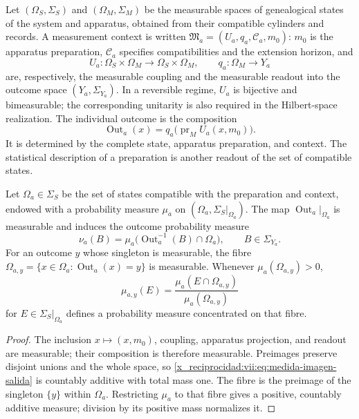 Let \((\Omega_S,\Sigma_S)\) and \((\Omega_M,\Sigma_M)\) be the
measurable spaces of genealogical states of the system and apparatus,
obtained from their compatible cylinders and records. A measurement
context is written \(\mathfrak M_a=(U_a,q_a,\mathcal C_a,m_0)\):
\(m_0\) is the apparatus preparation, \(\mathcal C_a\) specifies
compatibilities and the extension horizon, and
\[
 U_a:\Omega_S\times\Omega_M\longrightarrow\Omega_S\times\Omega_M,
 \qquad q_a:\Omega_M\longrightarrow Y_a
\]
are, respectively, the measurable coupling and the measurable readout into
the outcome space \((Y_a,\Sigma_{Y_a})\). In a reversible regime,
\(U_a\) is bijective and bimeasurable; the corresponding unitarity is
also required in the Hilbert-space realization. The individual outcome is the
composition
\begin{equation}
 \operatorname{Out}_a(x)
 =q_a\bigl(\operatorname{pr}_M U_a(x,m_0)\bigr).
 \label{x_reciprocidad:vii:eq:out-genealogico}
\end{equation}
It is determined by the complete state, apparatus preparation, and
context. The statistical description of a preparation is another readout
of the set of compatible states.

\begin{proposition}
\label{x_reciprocidad:vii:prop:medida-salida}
Let \(\Omega_a\in\Sigma_S\) be the set of states compatible with the
preparation and context, endowed with a probability measure \(\mu_a\)
on \((\Omega_a,\Sigma_S|_{\Omega_a})\).
The map \(\operatorname{Out}_a|_{\Omega_a}\) is measurable and induces
the outcome probability measure
\begin{equation}
 \nu_a(B)=\mu_a\bigl(\operatorname{Out}_a^{-1}(B)\cap\Omega_a\bigr),
 \qquad B\in\Sigma_{Y_a}.
 \label{x_reciprocidad:vii:eq:medida-imagen-salida}
\end{equation}
For an outcome \(y\) whose singleton is measurable, the fibre
\(\Omega_{a,y}=\{x\in\Omega_a:\operatorname{Out}_a(x)=y\}\)
is measurable. Whenever \(\mu_a(\Omega_{a,y})>0\),
\begin{equation}
 \mu_{a,y}(E)=
 \frac{\mu_a(E\cap\Omega_{a,y})}{\mu_a(\Omega_{a,y})}
 \label{x_reciprocidad:vii:eq:condicionamiento-salida}
\end{equation}
for \(E\in\Sigma_S|_{\Omega_a}\) defines a probability measure
concentrated on that fibre.
\end{proposition}
\begin{proof}
The inclusion \(x\mapsto(x,m_0)\), coupling, apparatus projection, and
readout are measurable; their composition is therefore measurable.
Preimages preserve disjoint unions and the whole space, so
\eqref{x_reciprocidad:vii:eq:medida-imagen-salida} is countably additive with total mass
one. The fibre is the preimage of the singleton \(\{y\}\) within
\(\Omega_a\). Restricting \(\mu_a\) to that fibre gives a positive,
countably additive measure; division by its positive mass normalizes it.
\end{proof}

